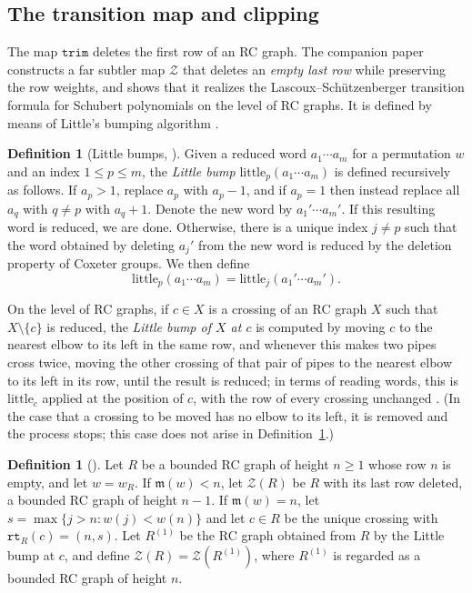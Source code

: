 \documentclass{amsart}
\theoremstyle{definition}
\newtheorem{definition}[lemma]{Definition}
\theoremstyle{remark}
\numberwithin{equation}{subsection}
\newcommand{\wof}[1]{w_{#1}}
\newcommand{\rtt}{\mathtt{rt}}
\newcommand{\trm}{\mathtt{trim}}
\newcommand{\zeromap}{\mathcal{Z}}
\newcommand{\ltb}{\mathrm{little}}
\newcommand{\maxd}{\mathfrak{m}}
\begin{document}
\subsection{The transition map and clipping}\label{section:cliptrim}

The map $\trm$ deletes the first row of an RC graph. The companion paper constructs a far subtler map $\zeromap$ that deletes an \emph{empty last row} while preserving the row weights, and shows that it realizes the Lascoux--Sch\"utzenberger transition formula for Schubert polynomials on the level of RC graphs. It is defined by means of Little's bumping algorithm \cite{little2003combinatorial}.

\begin{definition}[Little bumps, {\cite[Definition~\ref*{B-definition:littlebump}]{samuelbialgebra}}]\label{definition:littlebump}
  Given a reduced word $a_1\cdots a_m$ for a permutation $w$ and an index $1\leq p\leq m$, the \emph{Little bump} $\ltb_p(a_1\cdots a_m)$ is defined recursively as follows. If $a_p>1$, replace $a_p$ with $a_p-1$, and if $a_p=1$ then instead replace all $a_q$ with $q\neq p$ with $a_q+1$. Denote the new word by $a_1'\cdots a_m'$. If this resulting word is reduced, we are done. Otherwise, there is a unique index $j\neq p$ such that the word obtained by deleting $a_j'$ from the new word is reduced by the deletion property of Coxeter groups. We then define
  $$\ltb_p(a_1\cdots a_m) = \ltb_j(a_1'\cdots a_m').$$
\end{definition}

On the level of RC graphs, if $c\in X$ is a crossing of an RC graph $X$ such that $X\setminus\{c\}$ is reduced, the \emph{Little bump of $X$ at $c$} is computed by moving $c$ to the nearest elbow to its left in the same row, and whenever this makes two pipes cross twice, moving the other crossing of that pair of pipes to the nearest elbow to its left in its row, until the result is reduced; in terms of reading words, this is $\ltb_c$ applied at the position of $c$, with the row of every crossing unchanged \cite[\S\ref*{B-section:bpd}]{samuelbialgebra}. (In the case that a crossing to be moved has no elbow to its left, it is removed and the process stops; this case does not arise in Definition~\ref{definition:zeromap}.)

\begin{definition}[{\cite[Definition~\ref*{B-definition:zeromap}]{samuelbialgebra}}]\label{definition:zeromap}
Let $R$ be a bounded RC graph of height $n\geq 1$ whose row $n$ is empty, and let $w=\wof R$. If $\maxd(w)<n$, let $\zeromap(R)$ be $R$ with its last row deleted, a bounded RC graph of height $n-1$. If $\maxd(w)=n$, let $s=\max\{j>n: w(j)<w(n)\}$ and let $c\in R$ be the unique crossing with $\rtt_R(c)=(n,s)$. Let $R^{(1)}$ be the RC graph obtained from $R$ by the Little bump at $c$, and define $\zeromap(R)=\zeromap(R^{(1)})$, where $R^{(1)}$ is regarded as a bounded RC graph of height $n$.
\end{definition}
\end{document}

